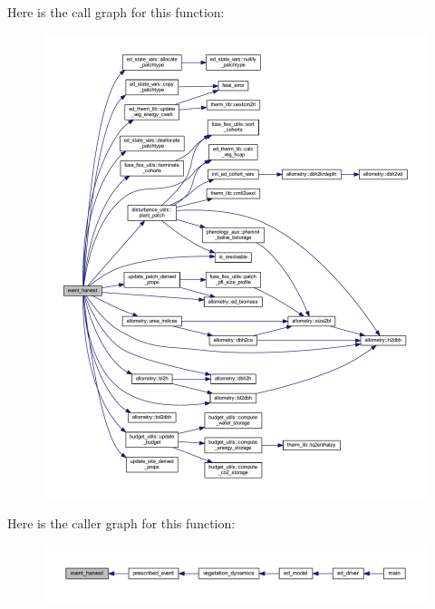 Here is the call graph for this function\+:\nopagebreak
\begin{figure}[H]
\begin{center}
\leavevmode
\includegraphics[width=350pt]{events_8f90_ad9cbf1522be96cc9af2fbf80b1402d5c_cgraph}
\end{center}
\end{figure}




Here is the caller graph for this function\+:\nopagebreak
\begin{figure}[H]
\begin{center}
\leavevmode
\includegraphics[width=350pt]{events_8f90_ad9cbf1522be96cc9af2fbf80b1402d5c_icgraph}
\end{center}
\end{figure}


